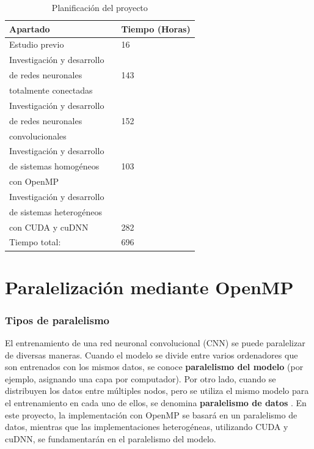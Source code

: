 \begin{table}[H]
	\centering
	\begin{tabular}{|lll|}
		\hline
		Apartado 	 &\vline  & Tiempo (Horas) \\
		\hline
		
		Estudio previo    & \vline & 16 \\			
		\hline
		Investigación y desarrollo  	 & \vline & 	\\
		de redes neuronales  	 & \vline & 143	\\
		totalmente conectadas 	 & \vline & 	\\
		\hline
		Investigación y desarrollo    & \vline & 	 \\	
		de redes neuronales    & \vline & 152	 \\			
		convolucionales    & \vline & 	 \\					
		\hline
		Investigación y desarrollo  	 & \vline & 	 \\
		de sistemas homogéneos  	 & \vline & 103	 \\
		con OpenMP 	 & \vline & 	 \\
		\hline
		Investigación y desarrollo     & \vline &  	\\
		de sistemas heterogéneos    & \vline &  \\ 
		con CUDA y cuDNN    & \vline & 282 \\ 	
		\hline
		\hline
		Tiempo total:				& \vline & 696 \\
		\hline
	\end{tabular}
	\caption{Planificación del proyecto}
	\label{tabla_planificación}
\end{table}


\section{Paralelización mediante OpenMP}

\subsubsection{Tipos de paralelismo}

El entrenamiento de una red neuronal convolucional (CNN) se puede paralelizar de diversas maneras. Cuando el modelo se divide entre varios ordenadores que son entrenados con los mismos datos, se conoce \textbf{paralelismo del modelo} \cite{data_model_parallelism} (por ejemplo, asignando una capa por computador). Por otro lado, cuando se distribuyen los datos entre múltiples nodos, pero se utiliza el mismo modelo para el entrenamiento en cada uno de ellos, se denomina \textbf{paralelismo de datos} \cite{model_parallelism}. En este proyecto, la implementación con OpenMP se basará en un paralelismo de datos, mientras que las implementaciones heterogéneas, utilizando CUDA y cuDNN, se fundamentarán en el paralelismo del modelo. \\

